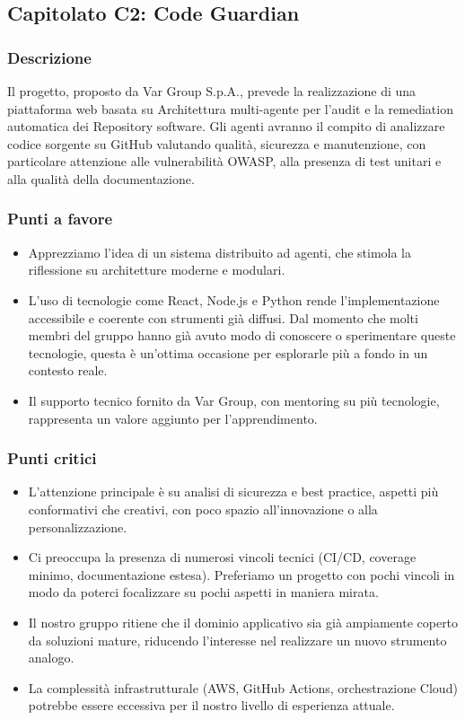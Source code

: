 \documentclass[a4paper,12pt]{article}
\begin{document}
\subsection{Capitolato C2: Code Guardian}

\subsubsection{Descrizione}
Il progetto, proposto da Var Group S.p.A., prevede la realizzazione di una piattaforma web basata su Architettura multi-agente per l’audit e la remediation automatica dei Repository software. Gli agenti avranno il compito di analizzare codice sorgente su GitHub valutando qualità, sicurezza e manutenzione, con particolare attenzione alle vulnerabilità OWASP, alla presenza di test unitari e alla qualità della documentazione.

\subsubsection{Punti a favore}
\begin{itemize}
    \item Apprezziamo l’idea di un sistema distribuito ad agenti, che stimola la riflessione su architetture moderne e modulari.
    \item L’uso di tecnologie come React, Node.js e Python rende l’implementazione accessibile e coerente con strumenti già diffusi. Dal momento che molti membri del gruppo hanno già avuto modo di conoscere o sperimentare queste tecnologie, questa è un’ottima occasione per esplorarle più a fondo in un contesto reale.
    \item Il supporto tecnico fornito da Var Group, con mentoring su più tecnologie, rappresenta un valore aggiunto per l’apprendimento.
\end{itemize}

\subsubsection{Punti critici}
\begin{itemize}
    \item L’attenzione principale è su analisi di sicurezza e best practice, aspetti più conformativi che creativi, con poco spazio all’innovazione o alla personalizzazione.
    \item Ci preoccupa la presenza di numerosi vincoli tecnici (CI/CD, coverage minimo, documentazione estesa). Preferiamo un progetto con pochi vincoli in modo da poterci focalizzare su pochi aspetti in maniera mirata.
    \item Il nostro gruppo ritiene che il dominio applicativo sia già ampiamente coperto da soluzioni mature, riducendo l’interesse nel realizzare un nuovo strumento analogo.
    \item La complessità infrastrutturale (AWS, GitHub Actions, orchestrazione Cloud) potrebbe essere eccessiva per il nostro livello di esperienza attuale.
\end{itemize}
\end{document}
